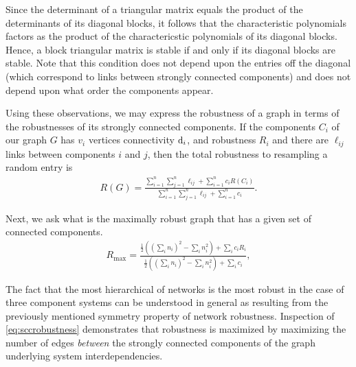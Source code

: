 Since the determinant of a triangular matrix equals the product of the determinants of its diagonal blocks, it follows that the characteristic polynomials factors as the product of the charactericstic polynomials of its diagonal blocks.  Hence, a block triangular matrix is stable if and only if its diagonal blocks are stable.  Note that this condition does not depend upon the entries off the diagonal (which correspond to links between strongly connected components) and does not depend upon what order the components appear.

Using these observations, we may express the robustness of a graph in terms of the robustnesses of its strongly connected components.
If the components $C_i$ of our graph $G$ has $v_i$ vertices connectivity $\mathrm{d}_i$, and robustness $R_i$ and there are $\ell_{ij}$ links between components $i$ and $j$, then the total robustness to resampling a random entry is
\begin{align}
R(G) = \frac{\sum_{i=1}^n \sum_{j=1}^n \ell_{ij} + \sum_{i=1}^n c_i R(C_i)}
            {\sum_{i=1}^n \sum_{j=1}^n \ell_{ij} + \sum_{i=1}^n c_i}. \label{eq:sccrobustness}
\end{align}

Next, we ask what is the maximally robust graph that has a given set of connected components.
\begin{align}
R_{\mathrm{max}} = \frac{\frac{1}{2} ((\sum_i n_i)^2 - \sum_i n_i^2) + \sum_i c_i R_i}{\frac{1}{2} ((\sum_i n_i)^2 - \sum_i n_i^2) + \sum_i c_i}, \label{eq:sccmaxrobustness}
\end{align}

The fact that the most hierarchical of networks is the most robust in the case of three component systems can be understood in general as resulting from the previously mentioned symmetry property of network robustness. Inspection of \ref{eq:sccrobustness} demonstrates that robustness is maximized by maximizing the number of edges \emph{between} the strongly connected components of the graph underlying system interdependencies.

